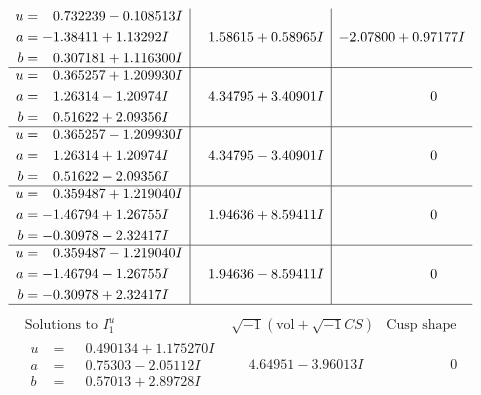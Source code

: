 \documentclass[1p]{elsarticle_modified}
\theoremstyle{definition}
\newcommand{\I}{\sqrt{-1}}
\begin{document}
$$\begin{array}{c|c|c}
\begin{aligned}
u &= \phantom{-}0.732239 - 0.108513 I \\
a &= -1.38411 + 1.13292 I \\
b &= \phantom{-}0.307181 + 1.116300 I\end{aligned}
 & \phantom{-}1.58615 + 0.58965 I & -2.07800 + 0.97177 I \\ \hline\begin{aligned}
u &= \phantom{-}0.365257 + 1.209930 I \\
a &= \phantom{-}1.26314 - 1.20974 I \\
b &= \phantom{-}0.51622 + 2.09356 I\end{aligned}
 & \phantom{-}4.34795 + 3.40901 I & \phantom{-0.000000 } 0 \\ \hline\begin{aligned}
u &= \phantom{-}0.365257 - 1.209930 I \\
a &= \phantom{-}1.26314 + 1.20974 I \\
b &= \phantom{-}0.51622 - 2.09356 I\end{aligned}
 & \phantom{-}4.34795 - 3.40901 I & \phantom{-0.000000 } 0 \\ \hline\begin{aligned}
u &= \phantom{-}0.359487 + 1.219040 I \\
a &= -1.46794 + 1.26755 I \\
b &= -0.30978 - 2.32417 I\end{aligned}
 & \phantom{-}1.94636 + 8.59411 I & \phantom{-0.000000 } 0 \\ \hline\begin{aligned}
u &= \phantom{-}0.359487 - 1.219040 I \\
a &= -1.46794 - 1.26755 I \\
b &= -0.30978 + 2.32417 I\end{aligned}
 & \phantom{-}1.94636 - 8.59411 I & \phantom{-0.000000 } 0\\
 \hline 
 \end{array}$$\newpage$$\begin{array}{c|c|c}  
\text{Solutions to }I^u_{1}& \I (\text{vol} + \sqrt{-1}CS) & \text{Cusp shape}\\
 \hline 
\begin{aligned}
u &= \phantom{-}0.490134 + 1.175270 I \\
a &= \phantom{-}0.75303 - 2.05112 I \\
b &= \phantom{-}0.57013 + 2.89728 I\end{aligned}
 & \phantom{-}4.64951 - 3.96013 I & \phantom{-0.000000 } 0 \\ \hline\begin{aligned}

\end{aligned}
\end{array}$$
\end{document}
